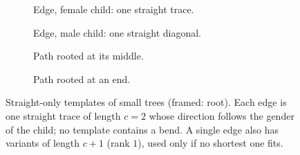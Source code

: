 \documentclass[11pt,a4paper]{article}
\newcommand{\gridbg}[4]{\draw[gridc,line width=0.4pt,step={(1,-1)}] (#1,#2) grid (#3,#4);}
\theoremstyle{remark}
\begin{document}
\begin{figure}[t]
\centering
\begin{subfigure}[b]{0.23\textwidth}\centering
{}
\caption{Edge, female child: one straight trace.}
\end{subfigure}\hfill
\begin{subfigure}[b]{0.23\textwidth}\centering
{}
\caption{Edge, male child: one straight diagonal.}
\end{subfigure}\hfill
\begin{subfigure}[b]{0.23\textwidth}\centering
{}
\caption{Path rooted at its middle.}
\end{subfigure}\hfill
\begin{subfigure}[b]{0.23\textwidth}\centering
{}
\caption{Path rooted at an end.}
\end{subfigure}
\caption{Straight-only templates of small trees (framed: root). Each edge is one straight trace of length $c=2$ whose
direction follows the gender of the child; no template contains a bend. A single edge also has variants of length
$c+1$ (rank $1$), used only if no shortest one fits.}
\label{fig:templates}
\end{figure}
\end{document}
